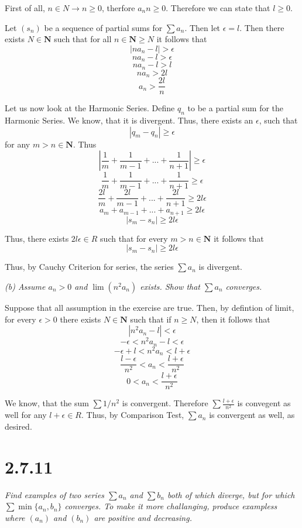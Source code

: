 \documentclass[11pt,oneside,titlepage]{book}
\begin{document}
First of all, $n \in N \to n \geq 0$, therfore $a_n n \geq 0$. Therefore
we can state that $l \geq 0$.

Let $(s_n)$ be a sequence of  partial sums  for $\sum a_n$. Then
let $\epsilon = l$. Then there exists $N \in \textbf{N}$ such that for all
$n \in \textbf{N} \geq N$ it follows that
$$ |n a_n - l| > \epsilon$$
$$ n a_n - l > \epsilon$$
$$ n a_n - l > l $$
$$ n a_n  > 2l $$
$$ a_n  > \frac{2l}{n} $$

Let us now look at the Harmonic Series. Define $q_n$ to be a partial sum for
the Harmonic Series. We know, that it is divergent. Thus,
there exists an $\epsilon$, such that
$$|q_m - q_n| \geq \epsilon$$
for any $m > n \in \textbf{N}$. Thus
$$|\frac{1}{m} + \frac{1}{m - 1} + ... + \frac{1}{n + 1} | \geq \epsilon$$
$$\frac{1}{m} + \frac{1}{m - 1} + ... + \frac{1}{n + 1} \geq \epsilon$$
$$\frac{2l}{m} + \frac{2l}{m - 1} + ... + \frac{2l}{n + 1} \geq 2l \epsilon$$
$$a_m + a_{m - 1} + ... + a_{n + 1} \geq 2l \epsilon$$
$$|s_m - s_n| \geq 2l \epsilon$$

Thus, there exists $2l\epsilon \in R$ such that for every
$m > n \in \textbf{N}$ it follows that 
$$|s_m - s_n| \geq 2l \epsilon$$

Thus, by Cauchy Criterion for series, the series $\sum a_n$ is divergent.

\textit{(b) Assume $a_n > 0$ and $\lim(n^2 a_n)$ exists. Show that
  $\sum a_n$ converges.}

Suppose that all assumption in the exercise are true. Then, by defintion
of limit, for every $\epsilon > 0$
there exists $N \in \textbf{N}$ such that if $n \geq N$, then it
follows that
$$|n^2 a_n - l| < \epsilon$$
$$- \epsilon < n^2 a_n - l < \epsilon$$
$$- \epsilon + l < n^2 a_n  < l + \epsilon$$
$$\frac{l - \epsilon}{n^2} < a_n  < \frac{l + \epsilon}{n^2}$$
$$0< a_n  < \frac{l + \epsilon}{n^2}$$

We know, that the sum $\sum 1/n^2$ is convergent. Therefore
$\sum \frac{ l + \epsilon}{n^2}$ is convegent as well for any
$l + \epsilon \in R$. Thus, by Comparison Test, $\sum a_n$ is convergent as
well, as desired.

\section*{2.7.11}
\textit{Find examples of two series $\sum a_n$ and $\sum b_n$ both of which
  diverge, but for which $\sum \min\{a_n, b_n\}$ converges. To make it more
  challanging, produce exampless where $(a_n)$ and $(b_n)$ are positive and
  decreasing.}
\end{document}
